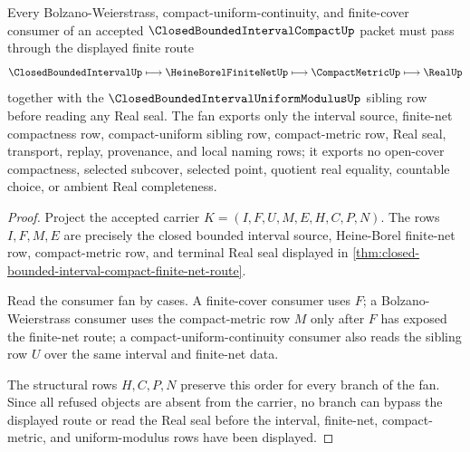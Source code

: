 \begin{theorem}
\label{thm:closed-bounded-interval-compact-finite-net-fan}
Every Bolzano-Weierstrass, compact-uniform-continuity, and finite-cover consumer of an accepted $\ClosedBoundedIntervalCompactUp$ packet must pass through the displayed finite route
$$
\ClosedBoundedIntervalUp
\longmapsto
\HeineBorelFiniteNetUp
\longmapsto
\CompactMetricUp
\longmapsto
\RealUp
$$
together with the $\ClosedBoundedIntervalUniformModulusUp$ sibling row before reading any Real seal. The fan exports only the interval source, finite-net compactness row, compact-uniform sibling row, compact-metric row, Real seal, transport, replay, provenance, and local naming rows; it exports no open-cover compactness, selected subcover, selected point, quotient real equality, countable choice, or ambient Real completeness.
\end{theorem}
\begin{proof}
Project the accepted carrier $K=(I,F,U,M,E,H,C,P,N)$. The rows $I,F,M,E$ are precisely the closed bounded interval source, Heine-Borel finite-net row, compact-metric row, and terminal Real seal displayed in \autoref{thm:closed-bounded-interval-compact-finite-net-route}.

Read the consumer fan by cases. A finite-cover consumer uses $F$; a Bolzano-Weierstrass consumer uses the compact-metric row $M$ only after $F$ has exposed the finite-net route; a compact-uniform-continuity consumer also reads the sibling row $U$ over the same interval and finite-net data.

The structural rows $H,C,P,N$ preserve this order for every branch of the fan. Since all refused objects are absent from the carrier, no branch can bypass the displayed route or read the Real seal before the interval, finite-net, compact-metric, and uniform-modulus rows have been displayed.
\end{proof}


